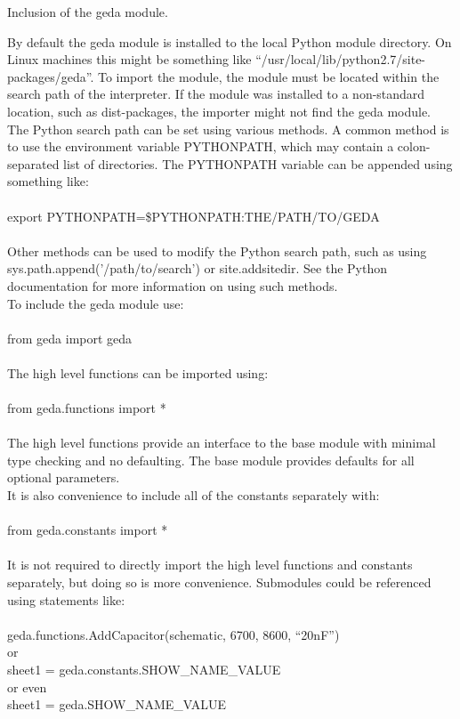  Inclusion of the geda module. 

  By default the geda module is installed to the local Python module directory. On Linux machines this might be something like ``/usr/local/lib/python2.7/site-packages/geda''. To import the module, the module must be located within the search path of the interpreter. If the module was installed to a non-standard location, such as dist-packages, the importer might not find the geda module. The Python search path can be set using various methods. A common method is to use the environment variable PYTHONPATH, which may contain a colon-separated list of directories. The PYTHONPATH variable can be appended using something like:\\ 
\\ 
  export PYTHONPATH=\$PYTHONPATH:THE/PATH/TO/GEDA\\ 
\\ 
 Other methods can be used to modify the Python search path, such as using sys.path.append('/path/to/search') or site.addsitedir. See the Python documentation for more information on using such methods. 
\\ 
  To include the geda module use: \\ 
\\ 
from geda import geda\\ 
\\ 
  The high level functions can be imported using: \\ 
\\ 
from geda.functions import *\\ 
\\ 
  The high level functions provide an interface to the base module with minimal type checking and no defaulting. The base module provides defaults for all optional parameters. 
\\ 
  It is also convenience to include all of the constants separately with: \\ 
\\ 
from geda.constants import *\\ 
\\ 
  It is not required to directly import the high level functions and constants separately, but doing so is more convenience. Submodules could be referenced using statements like: \\ 
\\ 
geda.functions.AddCapacitor(schematic, 6700, 8600, ``20nF'')\\ 
 or\\ 
sheet1 = geda.constants.SHOW\_NAME\_VALUE\\ 
 or even\\ 
sheet1 = geda.SHOW\_NAME\_VALUE\\ 
